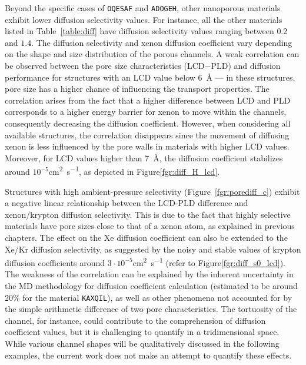 \documentclass[main]{subfiles}
\begin{document}
Beyond the specific cases of \texttt{OQESAF} and \texttt{ADOGEH}, other nanoporous materials exhibit lower diffusion selectivity values. For instance, all the other materials listed in Table~\ref{table:diff} have diffusion selectivity values ranging between $0.2$ and $1.4$. The diffusion selectivity and xenon diffusion coefficient vary depending on the shape and size distribution of the porous channels. A weak correlation can be observed between the pore size characteristics (LCD$-$PLD) and diffusion performance for structures with an LCD value below \SI{6}{\angstrom} --- in these structures, pore size has a higher chance of influencing the transport properties. The correlation arises from the fact that a higher difference between LCD and PLD corresponds to a higher energy barrier for xenon to move within the channels, consequently decreasing the diffusion coefficient. However, when considering all available structures, the correlation disappears since the movement of diffusing xenon is less influenced by the pore walls in materials with higher LCD values. Moreover, for LCD values higher than \SI{7}{\angstrom}, the diffusion coefficient stabilizes around $10^{-5}$\si{\square\cm\per\s}, as depicted in Figure\ref{fgr:diff_H_lcd}. 

Structures with high ambient-pressure selectivity (Figure~\ref{fgr:porediff_c}) exhibit a negative linear relationship between the LCD-PLD difference and xenon/krypton diffusion selectivity. This is due to the fact that highly selective materials have pore sizes close to that of a xenon atom, as explained in previous chapters. The effect on the Xe diffusion coefficient can also be extended to the Xe/Kr diffusion selectivity, as suggested by the noisy and stable values of krypton diffusion coefficients around $3\cdot10^{-5}$\si{\square\cm\per\s} (refer to Figure\ref{fgr:diff_s0_lcd}). The weakness of the correlation can be explained by the inherent uncertainty in the MD methodology for diffusion coefficient calculation (estimated to be around {20\%} for the material \texttt{KAXQIL}), as well as other phenomena not accounted for by the simple arithmetic difference of two pore characteristics. The tortuosity of the channel, for instance, could contribute to the comprehension of diffusion coefficient values, but it is challenging to quantify in a tridimensional space. While various channel shapes will be qualitatively discussed in the following examples, the current work does not make an attempt to quantify these effects.
\end{document}

